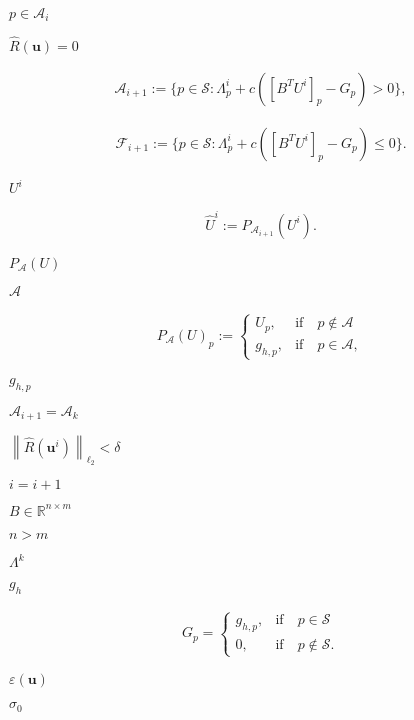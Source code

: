 \documentclass{article}
\begin{document}
$p\in\mathcal{A}_i$
\pagebreak

${\hat R}\left({\mathbf u}\right)=0$
\pagebreak

\begin{gather*}\mathcal{A}_{i+1}:=\lbrace p\in\mathcal{S}:\Lambda^i_p + c\left(\left[B^TU^i\right]_p - G_p\right) > 0\rbrace,\end{gather*}
\pagebreak

\begin{gather*}\mathcal{F}_{i+1}:=\lbrace p\in\mathcal{S}:\Lambda^i_p + c\left(\left[B^TU^i\right]_p - G_p\right) \leq 0\rbrace.\end{gather*}
\pagebreak

$U^i$
\pagebreak

\begin{gather*}\hat U^i := P_{\mathcal{A}_{i+1}}(U^i).\end{gather*}
\pagebreak

$P_{\mathcal{A}}(U)$
\pagebreak

$\mathcal{A}$
\pagebreak

\begin{gather*}P_{\mathcal{A}}(U)_p:=\begin{cases} U_p, & \textrm{if}\quad p\notin\mathcal{A}\\ g_{h,p}, & \textrm{if}\quad p\in\mathcal{A}, \end{cases}\end{gather*}
\pagebreak

$g_{h,p}$
\pagebreak

$\mathcal{A}_{i+1} = \mathcal{A}_k$
\pagebreak

$\left\| {\hat R}\left({\mathbf u}^{i}\right) \right\|_{\ell_2} < \delta$
\pagebreak

$i=i+1$
\pagebreak

$B\in\mathbb{R}^{n\times m}$
\pagebreak

$n>m$
\pagebreak

$\Lambda^k$
\pagebreak

$g_h$
\pagebreak

\begin{gather*}G_p = \begin{cases} g_{h,p}, & \text{if}\quad p\in\mathcal{S}\\ 0, & \text{if}\quad p\notin\mathcal{S}. \end{cases}\end{gather*}
\pagebreak

$\varepsilon(\mathbf u)$
\pagebreak

$\sigma_0$
\pagebreak
\end{document}

